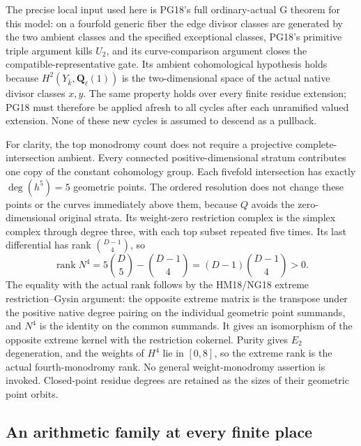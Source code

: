 The precise local input used here is PG18's
full ordinary-actual G theorem for this model:
on a fourfold generic fiber the edge divisor
classes are generated by the two ambient
classes and the specified exceptional classes,
PG18's primitive triple argument kills $U_2$,
and its curve-comparison argument closes the
compatible-representative gate.  Its ambient
cohomological hypothesis holds because
$H^2(Y_{\bar k},\mathbf Q_\ell(1))$ is the
two-dimensional space of the actual native
divisor classes $x,y$.  The same property
holds over every finite residue extension;
PG18 must therefore be applied afresh to
all cycles after each unramified valued
extension.  None of these new cycles is
assumed to descend as a pullback.

For clarity, the top monodromy count does
not require a projective complete-intersection
ambient.  Every connected positive-dimensional
stratum contributes one copy of the constant
cohomology group.  Each fivefold intersection
has exactly $\deg(h^5)=5$ geometric points.
The ordered resolution does not change these
points or the curves immediately above them,
because $Q$ avoids the zero-dimensional
original strata.  Its weight-zero restriction
complex is the simplex complex through degree
three, with each top subset repeated five
times.  Its last differential has rank
$\binom{D-1}{4}$, so
\[
 \operatorname{rank}N^4
       =5\binom D5-\binom{D-1}{4}
       =(D-1)\binom{D-1}{4}>0.
 \tag{PA18.5}\label{r18pa:monodromy}
\]
The equality with the actual rank follows
by the HM18/NG18 extreme restriction--Gysin
argument: the opposite extreme matrix is
the transpose under the positive native
degree pairing on the individual geometric
point summands, and $N^4$ is the identity
on the common summands.  It gives an
isomorphism of the opposite extreme kernel
with the restriction cokernel.  Purity gives
$E_2$ degeneration, and the weights of
$H^4$ lie in $[0,8]$, so the extreme rank
is the actual fourth-monodromy rank.
No general weight-monodromy assertion is
invoked.  Closed-point residue degrees are
retained as the sizes of their geometric
point orbits.

\subsection{An arithmetic family at every finite place}

